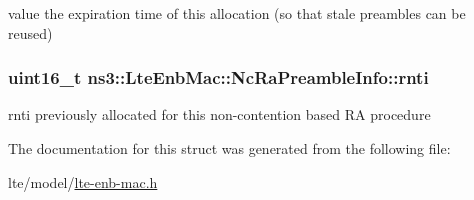 value the expiration time of this allocation (so that stale preambles can be reused) 

\subsubsection[{\texorpdfstring{rnti}{rnti}}]{\setlength{\rightskip}{0pt plus 5cm}uint16\+\_\+t ns3\+::\+Lte\+Enb\+Mac\+::\+Nc\+Ra\+Preamble\+Info\+::rnti}\hypertarget{structns3_1_1LteEnbMac_1_1NcRaPreambleInfo_acf410fae42e15f28e1b9714d4c7ba462}{}\label{structns3_1_1LteEnbMac_1_1NcRaPreambleInfo_acf410fae42e15f28e1b9714d4c7ba462}


rnti previously allocated for this non-\/contention based RA procedure 



The documentation for this struct was generated from the following file\+:\begin{DoxyCompactItemize}
\item 
lte/model/\hyperlink{lte-enb-mac_8h}{lte-\/enb-\/mac.\+h}\end{DoxyCompactItemize}
